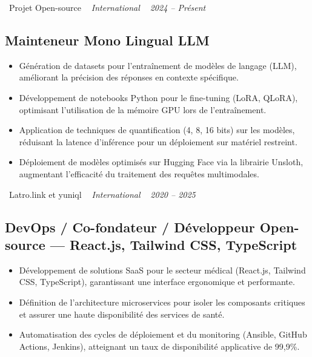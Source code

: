 \documentclass[10pt,a4paper]{article}
\begin{document}
\vspace{10pt}

\noindent\textcolor{primary}{ \faBuilding\ Projet Open-source} \quad
\textit{ \small \textcolor{darkgray}{ \faMapMarker\ } International } \hfill
\textit{ \small \textcolor{darkgray}{ \faCalendar\ } 2024 -- Présent }

\vspace{4pt}

\subsection*{Mainteneur Mono Lingual LLM}
\color{darkgray}
\begin{itemize}
  \item Génération de datasets pour l'entraînement de modèles de langage (LLM), améliorant la précision des réponses en contexte spécifique.
  \item Développement de notebooks Python pour le fine-tuning (LoRA, QLoRA), optimisant l'utilisation de la mémoire GPU lors de l'entraînement.
  \item Application de techniques de quantification (4, 8, 16 bits) sur les modèles, réduisant la latence d'inférence pour un déploiement sur matériel restreint.
  \item Déploiement de modèles optimisés sur Hugging Face via la librairie Unsloth, augmentant l'efficacité du traitement des requêtes multimodales.
\end{itemize}

\vspace{10pt}

\noindent\textcolor{primary}{ \faBuilding\ Latro.link et yuniql} \quad
\textit{ \small \textcolor{darkgray}{ \faMapMarker\ } International } \hfill
\textit{ \small \textcolor{darkgray}{ \faCalendar\ } 2020 -- 2025 }

\vspace{4pt}

\subsection*{DevOps / Co-fondateur / Développeur Open-source --- React.js, Tailwind CSS, TypeScript}
\color{darkgray}
\begin{itemize}
  \item Développement de solutions SaaS pour le secteur médical (React.js, Tailwind CSS, TypeScript), garantissant une interface ergonomique et performante.
  \item Définition de l'architecture microservices pour isoler les composants critiques et assurer une haute disponibilité des services de santé.
  \item Automatisation des cycles de déploiement et du monitoring (Ansible, GitHub Actions, Jenkins), atteignant un taux de disponibilité applicative de 99,9\%.
\end{itemize}
\end{document}
